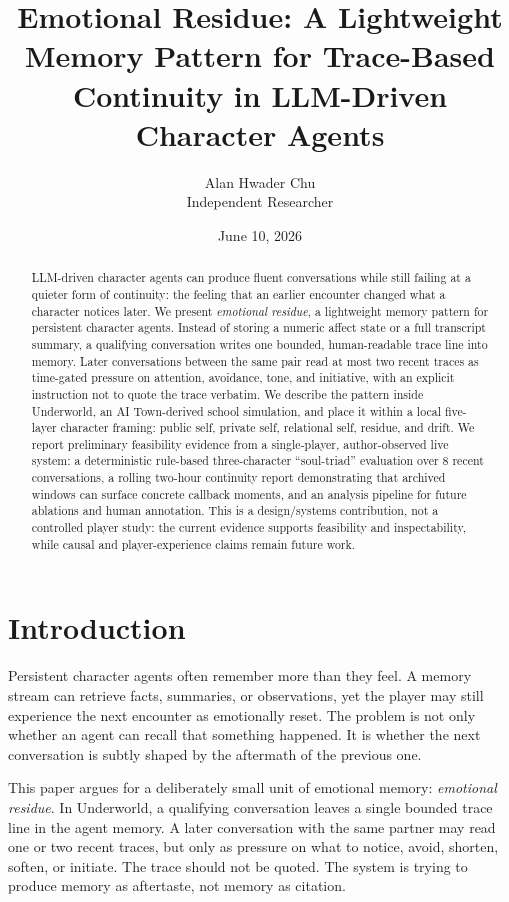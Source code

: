 \documentclass[11pt]{article}
\title{Emotional Residue: A Lightweight Memory Pattern for Trace-Based Continuity in LLM-Driven Character Agents}
\author{Alan Hwader Chu\\Independent Researcher}
\date{June 10, 2026}
\begin{document}
\maketitle

\begin{abstract}
LLM-driven character agents can produce fluent conversations while still failing at a quieter form of continuity: the feeling that an earlier encounter changed what a character notices later. We present \emph{emotional residue}, a lightweight memory pattern for persistent character agents. Instead of storing a numeric affect state or a full transcript summary, a qualifying conversation writes one bounded, human-readable trace line into memory. Later conversations between the same pair read at most two recent traces as time-gated pressure on attention, avoidance, tone, and initiative, with an explicit instruction not to quote the trace verbatim. We describe the pattern inside Underworld, an AI Town-derived school simulation, and place it within a local five-layer character framing: public self, private self, relational self, residue, and drift. We report preliminary feasibility evidence from a single-player, author-observed live system: a deterministic rule-based three-character ``soul-triad'' evaluation over 8 recent conversations, a rolling two-hour continuity report demonstrating that archived windows can surface concrete callback moments, and an analysis pipeline for future ablations and human annotation. This is a design/systems contribution, not a controlled player study: the current evidence supports feasibility and inspectability, while causal and player-experience claims remain future work.
\end{abstract}

\section{Introduction}

Persistent character agents often remember more than they feel. A memory stream can retrieve facts, summaries, or observations, yet the player may still experience the next encounter as emotionally reset. The problem is not only whether an agent can recall that something happened. It is whether the next conversation is subtly shaped by the aftermath of the previous one.

This paper argues for a deliberately small unit of emotional memory: \emph{emotional residue}. In Underworld, a qualifying conversation leaves a single bounded trace line in the agent memory. A later conversation with the same partner may read one or two recent traces, but only as pressure on what to notice, avoid, shorten, soften, or initiate. The trace should not be quoted. The system is trying to produce memory as aftertaste, not memory as citation.
\end{document}
